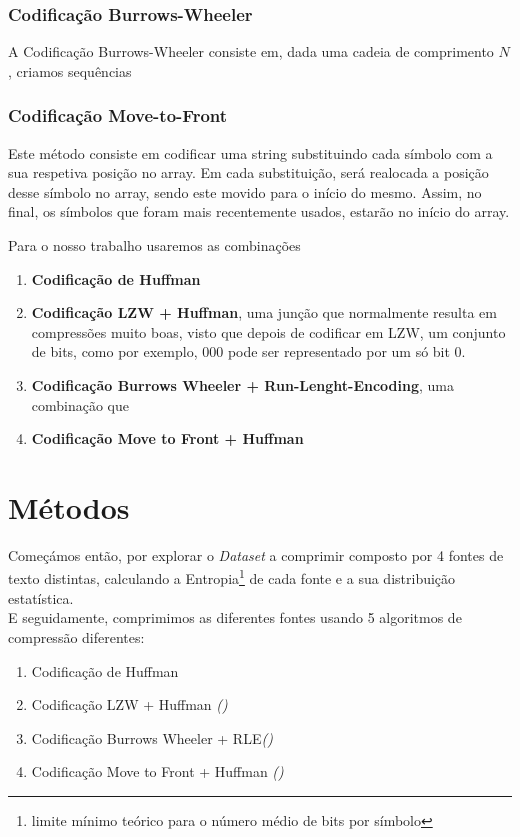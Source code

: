 \documentclass[12pt,journal,compsoc]{IEEEtran}
\begin{document}
\subsubsection{Codificação Burrows-Wheeler}
A Codificação Burrows-Wheeler consiste em, dada uma cadeia de comprimento $N$, criamos sequências 

\subsubsection{Codificação Move-to-Front}
Este método consiste em codificar uma string substituindo cada símbolo com a sua respetiva posição no array. Em cada substituição, será realocada a posição desse símbolo no array, sendo este movido para o início do mesmo. Assim, no final, os símbolos que foram mais recentemente usados, estarão no início do array.


Para o nosso trabalho usaremos as combinações
\begin{enumerate}
    \item \textbf{Codificação de Huffman}
    \item \textbf{Codificação LZW + Huffman}, uma junção que normalmente resulta em compressões muito boas, visto que depois de codificar em LZW, um conjunto de bits, como por exemplo, 000 pode ser representado por um só bit 0.
    \item \textbf{Codificação Burrows Wheeler + Run-Lenght-Encoding}, uma combinação que 
    
    \item \textbf{Codificação Move to Front + Huffman}
\end{enumerate}


\section{Métodos}\label{sec:metodos}
Começámos então, por explorar o \textit{Dataset} a comprimir composto por 4 fontes de texto distintas, calculando a Entropia\footnote{limite mínimo teórico para o número médio de bits por símbolo} de cada fonte e a sua distribuição estatística.\\
E seguidamente, comprimimos as diferentes fontes usando 5 algoritmos de compressão diferentes:

\begin{enumerate}
    \item Codificação de Huffman
    \item Codificação LZW + Huffman \textit{()}
    \item Codificação Burrows Wheeler + RLE\textit{()}
    \item Codificação Move to Front + Huffman \textit{()}
\end{enumerate}
\end{document}
